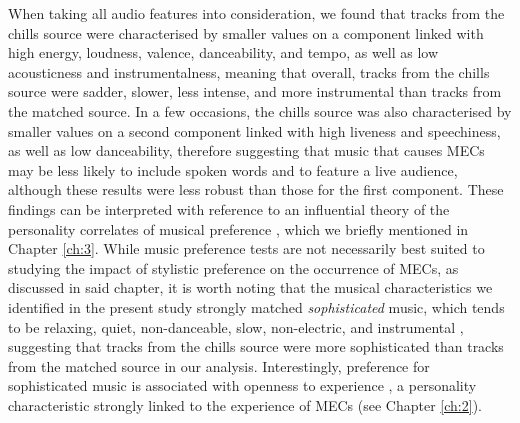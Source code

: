 When taking all audio features into consideration, we found that tracks from the chills source were characterised by smaller values on a component linked with high energy, loudness, valence, danceability, and tempo, as well as low acousticness and instrumentalness, meaning that overall, tracks from the chills source were sadder, slower, less intense, and more instrumental than tracks from the matched source. In a few occasions, the chills source was also characterised by smaller values on a second component linked with high liveness and speechiness, as well as low danceability, therefore suggesting that music that causes MECs may be less likely to include spoken words and to feature a live audience, although these results were less robust than those for the first component. These findings can be interpreted with reference to an influential theory of the personality correlates of musical preference \parencite{rentfrow2011}, which we briefly mentioned in Chapter \ref{ch:3}. While music preference tests are not necessarily best suited to studying the impact of stylistic preference on the occurrence of MECs, as discussed in said chapter, it is worth noting that the musical characteristics we identified in the present study strongly matched \emph{sophisticated} music, which tends to be relaxing, quiet, non-danceable, slow, non-electric, and instrumental \parencite{rentfrow2012}, suggesting that tracks from the chills source were more sophisticated than tracks from the matched source in our analysis. Interestingly, preference for sophisticated music is associated with openness to experience \parencite{schafer2017}, a personality characteristic strongly linked to the experience of MECs (see Chapter \ref{ch:2}).

